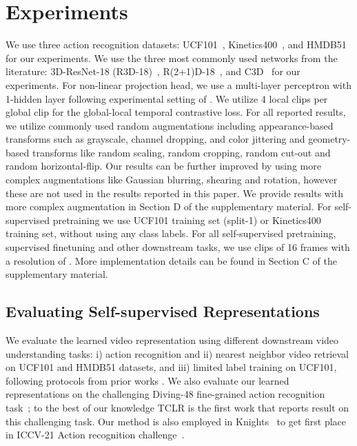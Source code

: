 \documentclass[10pt,twocolumn,letterpaper]{article}
\begin{document}
\section{Experiments}
\label{para:dataset} We use three action recognition datasets: UCF101~\cite{ucf101}, Kinetics400~\cite{kinetics}, and HMDB51~\cite{hmdb} for our experiments. We use the three most commonly used networks from the literature: 3D-ResNet-18 (R3D-18)~\cite{kenshohara}, R(2+1)D-18~\cite{r2plus1d}, and C3D~\cite{c3d} for our experiments. For non-linear projection head, we use a multi-layer perceptron with 1-hidden layer following experimental setting of \cite{simclr}. We utilize 4 local clips per global clip for the global-local temporal contrastive loss.  For all reported results, we utilize commonly used random augmentations including appearance-based transforms such as grayscale, channel dropping, and color jittering and geometry-based transforms like random scaling, random cropping, random cut-out and random horizontal-flip. Our results can be further improved by using more complex augmentations like Gaussian blurring, shearing and rotation, however these are not used in the results reported in this paper. We provide results with more complex augmentation in Section D of the supplementary material. For self-supervised pretraining we use UCF101 training set (split-1) or Kinetics400 training set, without using any class labels. For all self-supervised pretraining, supervised finetuning and other downstream tasks, we use clips of 16 frames with a resolution of . More implementation details can be found in Section C of the supplementary material.





 




















\subsection{Evaluating Self-supervised Representations}



 We evaluate the learned video representation using different downstream video understanding tasks: i) action recognition and ii) nearest neighbor video retrieval on UCF101 and HMDB51 datasets, and iii) limited label training on UCF101, following protocols from prior works \cite{memdpc}. We also evaluate our learned representations on the challenging Diving-48 fine-grained action recognition task~\cite{diving}; to the best of our knowledge TCLR is the first work that reports result on this challenging task. Our method is also employed in Knights~\cite{dave2021knights} to get first place in ICCV-21 Action recognition challenge~\cite{lengyel2022vipriors}.     
 
\end{document}
